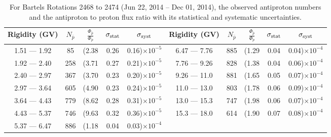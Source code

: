 \begin{table}[p] 
\renewcommand\baselinestretch{1.3}\selectfont
\setlength\tabcolsep{3pt}
\centering
\begin{tabular}{ccccc | ccccc}
\hline
\textbf{Rigidity}  (GV)  & $N_{\bar{p}}$ & $\frac{\Phi_{\bar{p}}}{\Phi_{p}}$ & $\sigma_{\rm{stat}}$ & $\sigma_{\rm{syst}}$ \hspace{1cm}   & \textbf{Rigidity}  (GV)  & $N_{\bar{p}}$ & $\frac{\Phi_{\bar{p}}}{\Phi_{p}}$ & $\sigma_{\rm{stat}}$ & $\sigma_{\rm{syst}}$ \hspace{1cm} \\ 
\hline
1.51 — 1.92   &  85                  &(2.38                          &  0.26              &      0.16)$\times 10^{-5}$  & 6.47 — 7.76                &  885                    &(1.29                                &  0.04                   &      0.04)$\times 10^{-4}$\\
1.92 — 2.40   &  258                &(3.71                          &  0.27              &      0.21)$\times 10^{-5}$  & 7.76 — 9.26                &  828                    &(1.38                                &  0.04                   &      0.06)$\times 10^{-4}$\\
2.40 — 2.97   &  367                &(3.70                          &  0.23              &      0.20)$\times 10^{-5}$  & 9.26 — 11.0                &  881                    &(1.65                                &  0.05                   &      0.07)$\times 10^{-4}$\\    
2.97 — 3.64   &  605                &(4.90                          &  0.23              &      0.24)$\times 10^{-5}$  & 11.0 — 13.0                 &  803                    &(1.78                                &  0.06                   &      0.09)$\times 10^{-4}$\\    
3.64 — 4.43   &  779                &(8.62                          &  0.28              &      0.31)$\times 10^{-5}$  & 13.0 — 15.3               &  747                    &(1.98                                &  0.06                   &      0.07)$\times 10^{-4}$\\
4.43 — 5.37   &  746                &(9.63                          &  0.32              &      0.36)$\times 10^{-5}$  & 15.3 — 18.0               &  614                    &(1.90                                &  0.07                   &      0.08)$\times 10^{-4}$\\
5.37 — 6.47   &  886                &(1.18                          &  0.04              &      0.03)$\times 10^{-4}$  & \\
\hline
\end{tabular}
\caption[Antiproton to proton flux ratio for Bartels Rotations 2468 to 2474]{For Bartels Rotations 2468 to 2474 (Jun 22, 2014 – Dec 01, 2014), the observed antiproton numbers and the antiproton to proton flux ratio with its statistical and systematic uncertainties.}
\label{TableOfDependent8}
\end{table}

